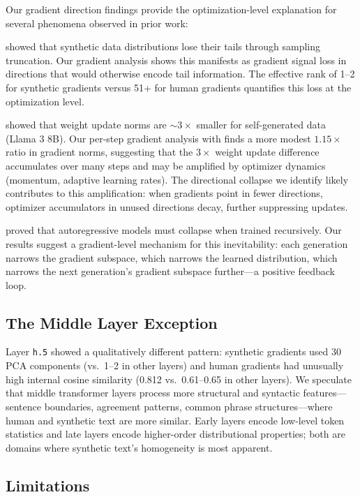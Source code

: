 Our gradient direction findings provide the optimization-level explanation for several phenomena observed in prior work:

 \citet{dohmatob2024tale} showed that synthetic data distributions lose their tails through sampling truncation. Our gradient analysis shows this manifests as gradient signal loss in directions that would otherwise encode tail information. The effective rank of 1--2 for synthetic gradients versus 51+ for human gradients quantifies this loss at the optimization level.

 \citet{wu2025mitigating} showed that weight update norms are ${\sim}3\times$ smaller for self-generated data (Llama 3 8B). Our per-step gradient analysis with \gptsmall finds a more modest $1.15\times$ ratio in gradient norms, suggesting that the $3\times$ weight update difference accumulates over many steps and may be amplified by optimizer dynamics (momentum, adaptive learning rates). The directional collapse we identify likely contributes to this amplification: when gradients point in fewer directions, optimizer accumulators in unused directions decay, further suppressing updates.

 \citet{wang2024theoretical} proved that autoregressive models must collapse when trained recursively. Our results suggest a gradient-level mechanism for this inevitability: each generation narrows the gradient subspace, which narrows the learned distribution, which narrows the next generation's gradient subspace further---a positive feedback loop.

\subsection{The Middle Layer Exception}

Layer \texttt{h.5} showed a qualitatively different pattern: synthetic gradients used 30 PCA components (vs.\ 1--2 in other layers) and human gradients had unusually high internal cosine similarity (0.812 vs.\ 0.61--0.65 in other layers). We speculate that middle transformer layers process more structural and syntactic features---sentence boundaries, agreement patterns, common phrase structures---where human and synthetic text are more similar. Early layers encode low-level token statistics and late layers encode higher-order distributional properties; both are domains where synthetic text's homogeneity is most apparent.

\subsection{Limitations}
\label{sec:limitations}

